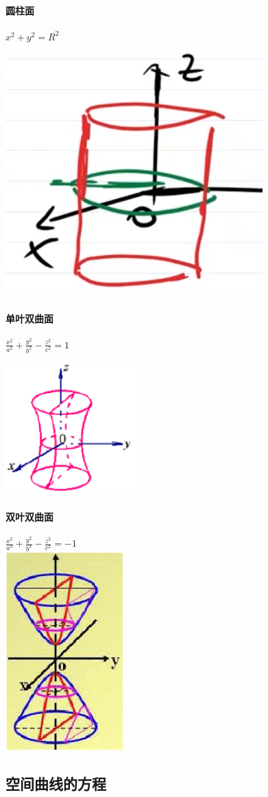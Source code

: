 \documentclass{article}
\begin{document}
\begin{flushleft}
	\paragraph{圆柱面}
	$x^2+y^2=R^2$\\
	\includegraphics[scale=0.5]{yz.png}
	
	\paragraph{单叶双曲面}
	$\frac{x^2}{a^2}+\frac{y^2}{b^2}-\frac{z^2}{c^2}=1$\\
	\includegraphics[scale=0.5]{dysqm.png}
	
	\paragraph{双叶双曲面}
	$\frac{x^2}{a^2}+\frac{y^2}{b^2}-\frac{z^2}{c^2}=-1$\\
	\includegraphics[scale=0.5]{sysqm.png}
	
	\subsection{空间曲线的方程}
	
	
\end{flushleft}
\end{document}
